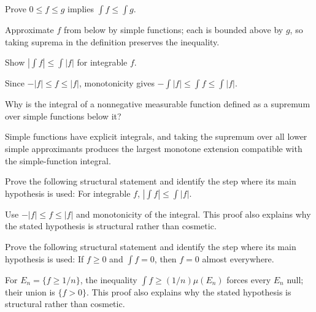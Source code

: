 \begin{problem}\label{prob:iii03-problem-06}
Prove \(0\le f\le g\) implies \(\int f\le\int g\).
\end{problem}
\begin{solution}
Approximate \(f\) from below by simple functions; each is bounded above by
\(g\), so taking suprema in the definition preserves the inequality.
\end{solution}

\begin{problem}\label{prob:iii03-problem-07}
Show \(|\int f|\le\int|f|\) for integrable \(f\).
\end{problem}
\begin{solution}
Since \(-|f|\le f\le|f|\), monotonicity gives
\(-\int|f|\le\int f\le\int|f|\).
\end{solution}

\begin{problem}\label{prob:iii03-problem-08}
Why is the integral of a nonnegative measurable function defined as a supremum over simple functions below it?
\end{problem}
\begin{solution}
Simple functions have explicit integrals, and taking the supremum over all
lower simple approximants produces the largest monotone extension compatible
with the simple-function integral.
\end{solution}

\begin{problem}\label{prob:iii03-problem-09}
Prove the following structural statement and identify the step where its main hypothesis is used: For integrable $f$, $|\int f|\le\int|f|$.
\end{problem}
\begin{solution}
Use $-|f|\le f\le|f|$ and monotonicity of the integral. This proof also explains why the stated hypothesis is structural rather than cosmetic.
\end{solution}

\begin{problem}\label{prob:iii03-problem-10}
Prove the following structural statement and identify the step where its main hypothesis is used: If $f\ge0$ and $\int f=0$, then $f=0$ almost everywhere.
\end{problem}
\begin{solution}
For $E_n=\{f\ge1/n\}$, the inequality $\int f\ge(1/n)\mu(E_n)$ forces every $E_n$ null; their union is $\{f>0\}$. This proof also explains why the stated hypothesis is structural rather than cosmetic.
\end{solution}

